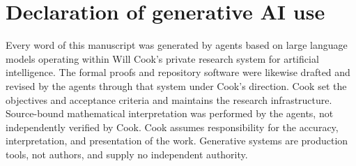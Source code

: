 \documentclass[10pt]{article}
\begin{document}
\section*{Declaration of generative AI use}
Every word of this manuscript was generated by agents based on large language
models operating within Will Cook's private research system for artificial
intelligence. The formal proofs and repository software were likewise drafted
and revised by the agents through that system under Cook's direction. Cook set
the objectives and acceptance criteria and maintains the research infrastructure.
Source-bound mathematical interpretation was performed by the agents, not
independently verified by Cook. Cook assumes responsibility for
the accuracy, interpretation, and presentation of the work. Generative systems
are production tools, not authors, and supply no independent authority.
\end{document}
